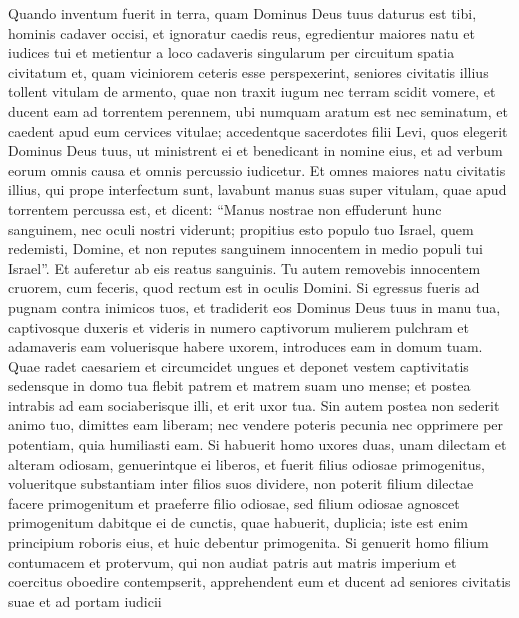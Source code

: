 \begin{biblechapter}
\begin{biblechapter}
\begin{biblechapter}
\begin{biblechapter}
\begin{biblechapter}
\begin{biblechapter}
\begin{biblechapter}
\begin{biblechapter}
\begin{biblechapter}
\begin{biblechapter}
\begin{biblechapter}
\begin{biblechapter}
\begin{biblechapter}
\begin{biblechapter}
\begin{biblechapter}
\begin{biblechapter}
\begin{biblechapter}
\begin{biblechapter}
\begin{biblechapter}
\begin{biblechapter}
\begin{biblechapter}
\verse Quando inventum fuerit in terra, quam Dominus Deus tuus daturus est tibi, hominis cadaver occisi, et ignoratur caedis reus, 
\verse egredientur maiores natu et iudices tui et metientur a loco cadaveris singularum per circuitum spatia civitatum 
\verse et, quam viciniorem ceteris esse perspexerint, seniores civitatis illius tollent vitulam de armento, quae non traxit iugum nec terram scidit vomere, 
\verse et ducent eam ad torrentem perennem, ubi numquam aratum est nec seminatum, et caedent apud eum cervices vitulae; 
\verse accedentque sacerdotes filii Levi, quos elegerit Dominus Deus tuus, ut ministrent ei et benedicant in nomine eius, et ad verbum eorum omnis causa et omnis percussio iudicetur. 
\verse Et omnes maiores natu civitatis illius, qui prope interfectum sunt, lavabunt manus suas super vitulam, quae apud torrentem percussa est, 
\verse et dicent: “Manus nostrae non effuderunt hunc sanguinem, nec oculi nostri viderunt; 
\verse propitius esto populo tuo Israel, quem redemisti, Domine, et non reputes sanguinem innocentem in medio populi tui Israel”. Et auferetur ab eis reatus sanguinis. 
\verse Tu autem removebis innocentem cruorem, cum feceris, quod rectum est in oculis Domini.
 \verse Si egressus fueris ad pugnam contra inimicos tuos, et tradiderit eos Dominus Deus tuus in manu tua, captivosque duxeris 
\verse et videris in numero captivorum mulierem pulchram et adamaveris eam voluerisque habere uxorem, 
\verse introduces eam in domum tuam. Quae radet caesariem et circumcidet ungues 
\verse et deponet vestem captivitatis sedensque in domo tua flebit patrem et matrem suam uno mense; et postea intrabis ad eam sociaberisque illi, et erit uxor tua. 
 \verse Sin autem postea non sederit animo tuo, dimittes eam liberam; nec vendere poteris pecunia nec opprimere per potentiam, quia humiliasti eam.
 \verse Si habuerit homo uxores duas, unam dilectam et alteram odiosam, genuerintque ei liberos, et fuerit filius odiosae primogenitus, 
\verse volueritque substantiam inter filios suos dividere, non poterit filium dilectae facere primogenitum et praeferre filio odiosae, 
\verse sed filium odiosae agnoscet primogenitum dabitque ei de cunctis, quae habuerit, duplicia; iste est enim principium roboris eius, et huic debentur primogenita.
 \verse Si genuerit homo filium contumacem et protervum, qui non audiat patris aut matris imperium et coercitus oboedire contempserit, 
\verse apprehendent eum et ducent ad seniores civitatis suae et ad portam iudicii 

\end{biblechapter}
\end{biblechapter}
\end{biblechapter}
\end{biblechapter}
\end{biblechapter}
\end{biblechapter}
\end{biblechapter}
\end{biblechapter}
\end{biblechapter}
\end{biblechapter}
\end{biblechapter}
\end{biblechapter}
\end{biblechapter}
\end{biblechapter}
\end{biblechapter}
\end{biblechapter}
\end{biblechapter}
\end{biblechapter}
\end{biblechapter}
\end{biblechapter}
\end{biblechapter}
